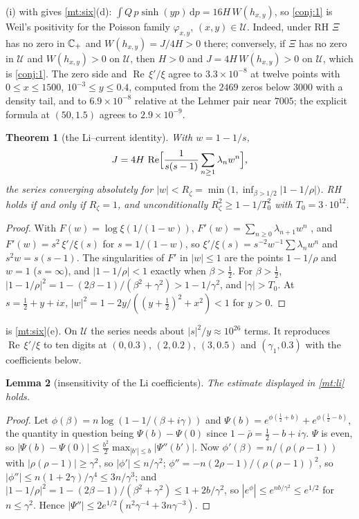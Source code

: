 \documentclass[11pt]{article}
\newtheorem{theorem}{Theorem}[section]
\newtheorem{lemma}[theorem]{Lemma}
\theoremstyle{definition}\newtheorem{definition}[theorem]{Definition}
\theoremstyle{remark}\newtheorem{remark}[theorem]{Remark}
\newcommand{\dd}{\,\mathrm d}\newcommand{\e}{\mathrm e}
\renewcommand{\Re}{\operatorname{Re}}\renewcommand{\Im}{\operatorname{Im}}
\begin{document}
(i) with \cite{S01} gives \cref{mt:six}(d): $\int Q\,p\sinh(yp)\dd p=16H\,W(h_{x,y})$, so \cref{conj:1} is Weil's positivity for the Poisson family $\varphi_{x,y}$, $(x,y)\in\mathcal U$. Indeed, under RH $\Xi$ has no zero in $\mathbb C_+$ and $W(h_{x,y})=J/4H>0$ there; conversely, if $\Xi$ has no zero in $\mathcal U$ and $W(h_{x,y})>0$ on $\mathcal U$, then $H>0$ and $J=4H\,W(h_{x,y})>0$ on $\mathcal U$, which is \cref{conj:1}. The zero side and $\Re\,\xi'/\xi$ agree to $3.3\times10^{-8}$ at twelve points with $0\le x\le1500$, $10^{-3}\le y\le0.4$, computed from the $2469$ zeros below $3000$ with a density tail, and to $6.9\times10^{-8}$ relative at the Lehmer pair near $7005$; the explicit formula at $(50,1.5)$ agrees to $2.9\times10^{-9}$.

\begin{theorem}[the Li--current identity]\label{thm:li}
With $w=1-1/s$,
\[
J=4H\,\Re\Bigl[\frac1{s(s-1)}\sum_{n\ge1}\lambda_nw^n\Bigr],
\]
the series converging absolutely for $|w|<R_\zeta=\min\bigl(1,\inf_{\beta>1/2}|1-1/\rho|\bigr)$. RH holds if and only if $R_\zeta=1$, and unconditionally $R_\zeta^2\ge1-1/T_0^2$ with $T_0=3\cdot10^{12}$.
\end{theorem}
\begin{proof}
With $F(w)=\log\xi(1/(1-w))$, $F'(w)=\sum_{n\ge0}\lambda_{n+1}w^n$ \cite{Keiper,BL}, and $F'(w)=s^2\,\xi'/\xi(s)$ for $s=1/(1-w)$, so $\xi'/\xi(s)=s^{-2}w^{-1}\sum\lambda_nw^n$ and $s^2w=s(s-1)$. The singularities of $F'$ in $|w|\le1$ are the points $1-1/\rho$ and $w=1$ ($s=\infty$), and $|1-1/\rho|<1$ exactly when $\beta>\frac12$. For $\beta>\frac12$, $|1-1/\rho|^2=1-(2\beta-1)/(\beta^2+\gamma^2)>1-1/\gamma^2$, and $|\gamma|>T_0$. At $s=\frac12+y+ix$, $|w|^2=1-2y/((y+\frac12)^2+x^2)<1$ for $y>0$.
\end{proof}

 is \cref{mt:six}(e). On $\mathcal U$ the series needs about $|s|^2/y\approx10^{26}$ terms. It reproduces $\Re\,\xi'/\xi$ to ten digits at $(0,0.3)$, $(2,0.2)$, $(3,0.5)$ and $(\gamma_1,0.3)$ with the coefficients below.

\begin{lemma}[insensitivity of the Li coefficients]\label{lem:insens}
The estimate displayed in \cref{mt:li} holds.
\end{lemma}
\begin{proof}
Let $\phi(\beta)=n\log(1-1/(\beta+i\gamma))$ and $\Psi(b)=e^{\phi(\frac12+b)}+e^{\phi(\frac12-b)}$, the quantity in question being $\Psi(b)-\Psi(0)$ since $1-\bar\rho=\frac12-b+i\gamma$. $\Psi$ is even, so $|\Psi(b)-\Psi(0)|\le\frac{b^2}2\max_{|b'|\le b}|\Psi''(b')|$. Now $\phi'(\beta)=n/(\rho(\rho-1))$ with $|\rho(\rho-1)|\ge\gamma^2$, so $|\phi'|\le n/\gamma^2$; $\phi''=-n(2\rho-1)/(\rho(\rho-1))^2$, so $|\phi''|\le n(1+2\gamma)/\gamma^4\le3n/\gamma^3$; and $|1-1/\rho|^2=1-(2\beta-1)/(\beta^2+\gamma^2)\le1+2b/\gamma^2$, so $|e^\phi|\le e^{nb/\gamma^2}\le e^{1/2}$ for $n\le\gamma^2$. Hence $|\Psi''|\le2e^{1/2}(n^2\gamma^{-4}+3n\gamma^{-3})$.
\end{proof}
\end{document}
